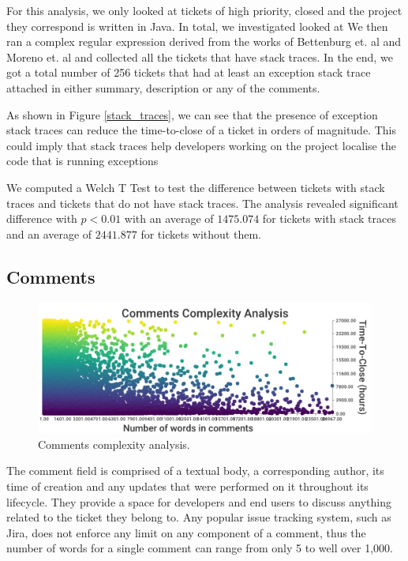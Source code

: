 \documentclass{mpaper}
\begin{document}
For this analysis, we only looked at tickets of high priority, closed and the project they correspond 
is written in Java. In total, we investigated looked at We then ran a complex regular expression derived from the works of Bettenburg et. al 
\cite{bettenburg2012using} and Moreno et. al \cite{moreno2014use} and collected all the tickets that have 
stack traces. In the end, we got a total number of 256 tickets that had at least an exception stack trace 
attached in either summary, description or any of the comments.

As shown in Figure \ref{stack_traces}, we can see that the presence of exception stack traces can 
reduce the time-to-close of a ticket in orders of magnitude. This could imply that stack traces help 
developers working on the project localise the code that is running exceptions 

We computed a Welch T Test to test the difference between tickets with stack traces and tickets that 
do not have stack traces. The analysis revealed significant difference with $p < 0.01$ with an
average of $1475.074$ for tickets with stack traces and an average of $2441.877$
for tickets without them.

\subsection{Comments}

\begin{figure}[ht]
  \begin{center}
    \includegraphics[scale=0.25]{images/comment_complexity.png}
  \end{center}
  \caption{\label{comments}Comments complexity analysis.}
\end{figure}

The comment field is comprised of a textual body, a corresponding author, its time of creation and any updates 
that were performed on it throughout its lifecycle. They provide a space for developers and end users to discuss 
anything related to the ticket they belong to. Any popular issue tracking system, such as Jira, does not enforce 
any limit on any component of a comment, thus the number of words for a single comment can range from only 5 
to well over 1,000. 
\end{document}
